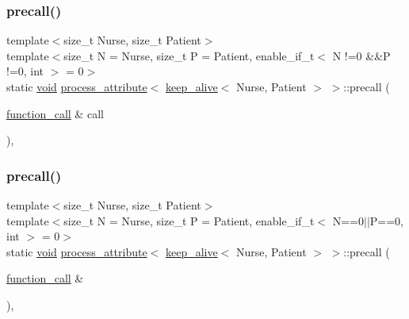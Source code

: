 \subsubsection{\texorpdfstring{precall()}{precall()}\hspace{0.1cm}{\footnotesize\ttfamily [1/2]}}
{\footnotesize\ttfamily template$<$size\+\_\+t Nurse, size\+\_\+t Patient$>$ \\
template$<$size\+\_\+t N = Nurse, size\+\_\+t P = Patient, enable\+\_\+if\+\_\+t$<$ N !=0 \&\&\+P !=0, int $>$  = 0$>$ \\
static \mbox{\hyperlink{_s_d_l__opengles2__gl2ext_8h_ae5d8fa23ad07c48bb609509eae494c95}{void}} \mbox{\hyperlink{structprocess__attribute}{process\+\_\+attribute}}$<$ \mbox{\hyperlink{structkeep__alive}{keep\+\_\+alive}}$<$ Nurse, Patient $>$ $>$\+::precall (\begin{DoxyParamCaption}\item[{\mbox{\hyperlink{structfunction__call}{function\+\_\+call}} \&}]{call }\end{DoxyParamCaption})\hspace{0.3cm}{\ttfamily [inline]}, {\ttfamily [static]}}

\mbox{\label{structprocess__attribute_3_01keep__alive_3_01_nurse_00_01_patient_01_4_01_4_afb78d6550e0edc2aa66c8ab8a3397f12}} 
\subsubsection{\texorpdfstring{precall()}{precall()}\hspace{0.1cm}{\footnotesize\ttfamily [2/2]}}
{\footnotesize\ttfamily template$<$size\+\_\+t Nurse, size\+\_\+t Patient$>$ \\
template$<$size\+\_\+t N = Nurse, size\+\_\+t P = Patient, enable\+\_\+if\+\_\+t$<$ N==0$\vert$$\vert$\+P==0, int $>$  = 0$>$ \\
static \mbox{\hyperlink{_s_d_l__opengles2__gl2ext_8h_ae5d8fa23ad07c48bb609509eae494c95}{void}} \mbox{\hyperlink{structprocess__attribute}{process\+\_\+attribute}}$<$ \mbox{\hyperlink{structkeep__alive}{keep\+\_\+alive}}$<$ Nurse, Patient $>$ $>$\+::precall (\begin{DoxyParamCaption}\item[{\mbox{\hyperlink{structfunction__call}{function\+\_\+call}} \&}]{ }\end{DoxyParamCaption})\hspace{0.3cm}{\ttfamily [inline]}, {\ttfamily [static]}}



